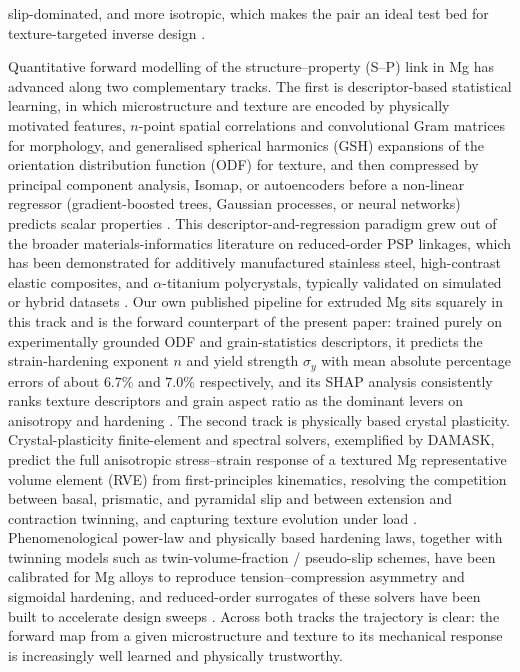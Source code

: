 \documentclass[preprint,12pt]{elsarticle}
\begin{document}
slip-dominated, and more isotropic, which makes the pair an ideal test bed for texture-targeted inverse design \cite{AZ31-TC-asymmetry,Mg-Zn-Gd-DRX-RE-texture,Guru2025}.

Quantitative forward modelling of the structure--property (S--P) link in Mg has advanced along two complementary tracks. The first is descriptor-based statistical learning, in which microstructure and texture are encoded by physically motivated features, $n$-point spatial correlations and convolutional Gram matrices for morphology, and generalised spherical harmonics (GSH) expansions of the orientation distribution function (ODF) for texture, and then compressed by principal component analysis, Isomap, or autoencoders before a non-linear regressor (gradient-boosted trees, Gaussian processes, or neural networks) predicts scalar properties \cite{Guru2025,Kalidindi-MKS-2015}. This descriptor-and-regression paradigm grew out of the broader materials-informatics literature on reduced-order PSP linkages, which has been demonstrated for additively manufactured stainless steel, high-contrast elastic composites, and $\alpha$-titanium polycrystals, typically validated on simulated or hybrid datasets \cite{Saunders-316L-AM-2019,FernandezZelaia-ElasticComposites-2019,Paulson-alphaTi-2017}. Our own published pipeline for extruded Mg sits squarely in this track and is the forward counterpart of the present paper: trained purely on experimentally grounded ODF and grain-statistics descriptors, it predicts the strain-hardening exponent $n$ and yield strength $\sigma_y$ with mean absolute percentage errors of about $6.7\%$ and $7.0\%$ respectively, and its SHAP analysis consistently ranks texture descriptors and grain aspect ratio as the dominant levers on anisotropy and hardening \cite{Guru2025}. The second track is physically based crystal plasticity. Crystal-plasticity finite-element and spectral solvers, exemplified by DAMASK, predict the full anisotropic stress--strain response of a textured Mg representative volume element (RVE) from first-principles kinematics, resolving the competition between basal, prismatic, and pyramidal slip and between extension and contraction twinning, and capturing texture evolution under load \cite{Roters-DAMASK-2019,Micromech-HCP-Mg,Graff-Mg-CP}. Phenomenological power-law and physically based hardening laws, together with twinning models such as twin-volume-fraction / pseudo-slip schemes, have been calibrated for Mg alloys to reproduce tension--compression asymmetry and sigmoidal hardening, and reduced-order surrogates of these solvers have been built to accelerate design sweeps \cite{Agnew-Review-Mg-2006,Micromech-HCP-Mg}. Across both tracks the trajectory is clear: the forward map from a given microstructure and texture to its mechanical response is increasingly well learned and physically trustworthy.
\end{document}
